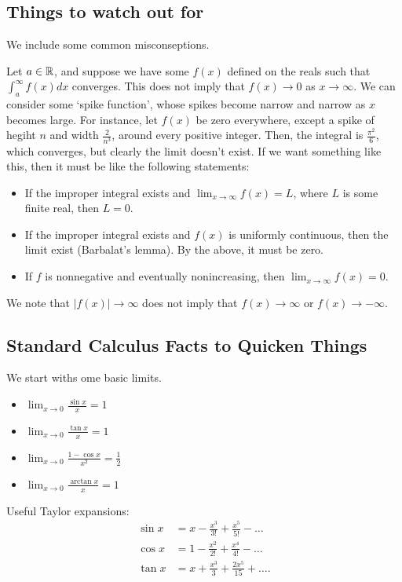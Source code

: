 \subsection{Things to watch out for}

We include some common misconseptions.

\begin{remark}
Let $a \in \mathbb{R}$, and suppose we have some $f(x)$ defined on the reals 
such that $\int_a^{\infty} f(x) dx$ converges. This does not imply that 
$f(x) \rightarrow 0$ as $x \rightarrow \infty$. We can consider some 
`spike function', whose spikes become narrow and narrow as $x$ becomes large.
For instance, let $f(x)$ be zero everywhere, except a spike of hegiht $n$ 
and width $\frac{2}{n^3}$, around every positive integer. Then, the integral 
is $\frac{\pi^2}{6}$, which converges, but clearly the limit doesn't exist. 
If we want something like this, then it must be like the following statements:
\begin{itemize}
\item If the improper integral exists and $\lim_{x \rightarrow \infty} f(x) = L$, 
where $L$ is some finite real, then $L = 0$.
\item If the improper integral exists and $f(x)$ is uniformly continuous, then 
the limit exist (Barbalat's lemma). By the above, it must be zero.
\item If $f$ is nonnegative and eventually nonincreasing, then $\lim_{x \rightarrow \infty} f(x) = 0$.
\end{itemize}
\end{remark}

\begin{remark}
We note that $|f(x)| \rightarrow \infty$  does not imply that $f(x) \rightarrow \infty$
or $f(x)\rightarrow -\infty$.
\end{remark}

\subsection{Standard Calculus Facts to Quicken Things}

We start withs ome basic limits.
\begin{itemize}
\item $\lim_{x\rightarrow 0}\frac{\sin x}{x}=1$
\item $\lim_{x\rightarrow 0}\frac{\tan x}{x}=1$
\item $\lim_{x\rightarrow 0}\frac{1-\cos x}{x^2}=\frac{1}{2}$
\item $\lim_{x\rightarrow 0}\frac{\arctan x}{x}=1$
\end{itemize}

Useful Taylor expansions:
\begin{align*}
\sin x&=x-\frac{x^3}{3!} + \frac{x^5}{5!} - \dots \\
\cos x&=1-\frac{x^2}{2!} + \frac{x^4}{4!} - \dots \\
\tan x&=x+\frac{x^3}{3}+ \frac{2x^5}{15} + \dots.
\end{align*}